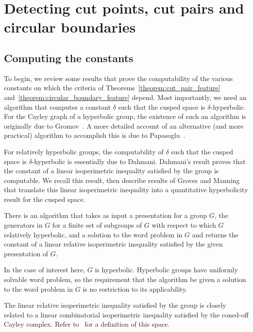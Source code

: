 \section{Detecting cut points, cut pairs and circular boundaries}\label{section:detecting_topology}

\subsection{Computing the constants}\label{section:computing_the_constants}

To begin, we review some results that prove the computability of the various constants on which the criteria of Theorems~\ref{theorem:cut_pair_feature} and~\ref{theorem:circular_boundary_feature} depend.
Most importantly, we need an algorithm that computes a constant $\delta$ such that the cusped space is $\delta$-hyperbolic.
For the Cayley graph of a hyperbolic group, the existence of such an algorithm is originally due to Gromov~\cite{gromov87}.
A more detailed account of an alternative (and more practical) algorithm to accomplish this is due to Papasoglu~\cite{papasoglu95}. 

For relatively hyperbolic groups, the computability of $\delta$ such that the cusped space is $\delta$-hyperbolic is essentially due to Dahmani. 
Dahmani's result proves that the constant of a linear isoperimetric inequality satisfied by the group is computable.
We recall this result, then describe results of Groves and Manning that translate this linear isoperimetric inequality into a quantitative hyperbolicity result for the cusped space.

\begin{proposition}\cite[Prop.\ 2.3]{dahmani08} \label{thm:linearisoperimetricinequality} 
 There is an algorithm that takes as input a presentation for a group $G$, the generators in $G$ for a finite set of subgroups of $G$ with respect to which $G$ relatively hyperbolic, and a solution to the word problem in $G$ and returns the constant of a linear relative isoperimetric inequality satisfied by the given presentation of $G$.
\end{proposition}

In the case of interest here, $G$ is hyperbolic. 
Hyperbolic groups have uniformly solvable word problem, so the requirement that the algorithm be given a solution to the word problem in $G$ is no restriction to its applicability.

The linear relative isoperimetric inequality satisfied by the group is closely related to a linear combinatorial isoperimetric inequality satisfied by the coned-off Cayley complex. 
Refer to~\cite[Definition 2.47]{grovesmanning08} for a definition of this space.

